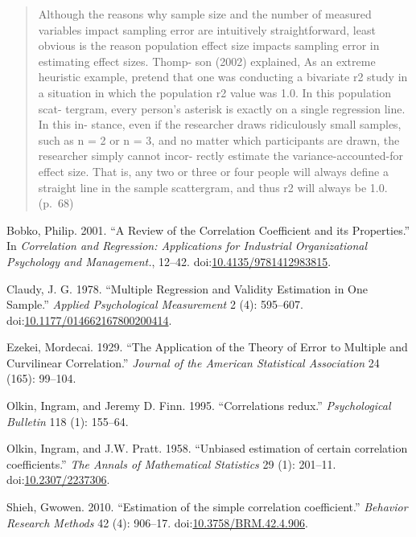\documentclass[]{article}
\begin{document}
\begin{quote}
Although the reasons why sample size and the number of measured
variables impact sampling error are intuitively straightforward, least
obvious is the reason population effect size impacts sampling error in
estimating effect sizes. Thomp- son (2002) explained, As an extreme
heuristic example, pretend that one was conducting a bivariate r2 study
in a situation in which the population r2 value was 1.0. In this
population scat- tergram, every person's asterisk is exactly on a single
regression line. In this in- stance, even if the researcher draws
ridiculously small samples, such as n = 2 or n = 3, and no matter which
participants are drawn, the researcher simply cannot incor- rectly
estimate the variance-accounted-for effect size. That is, any two or
three or four people will always define a straight line in the sample
scattergram, and thus r2 will always be 1.0. (p.~68)
\end{quote}

\hypertarget{refs}{}
\hypertarget{ref-Bobko2001}{}
Bobko, Philip. 2001. ``A Review of the Correlation Coefficient and its
Properties.'' In \emph{Correlation and Regression: Applications for
Industrial Organizational Psychology and Management.}, 12--42.
doi:\href{https://doi.org/10.4135/9781412983815}{10.4135/9781412983815}.

\hypertarget{ref-Claudy1978}{}
Claudy, J. G. 1978. ``Multiple Regression and Validity Estimation in One
Sample.'' \emph{Applied Psychological Measurement} 2 (4): 595--607.
doi:\href{https://doi.org/10.1177/014662167800200414}{10.1177/014662167800200414}.

\hypertarget{ref-Ezekei1929}{}
Ezekei, Mordecai. 1929. ``The Application of the Theory of Error to
Multiple and Curvilinear Correlation.'' \emph{Journal of the American
Statistical Association} 24 (165): 99--104.

\hypertarget{ref-Olkin1995}{}
Olkin, Ingram, and Jeremy D. Finn. 1995. ``Correlations redux.''
\emph{Psychological Bulletin} 118 (1): 155--64.

\hypertarget{ref-Olkin1958}{}
Olkin, Ingram, and J.W. Pratt. 1958. ``Unbiased estimation of certain
correlation coefficients.'' \emph{The Annals of Mathematical Statistics}
29 (1): 201--11.
doi:\href{https://doi.org/10.2307/2237306}{10.2307/2237306}.

\hypertarget{ref-Shieh2010}{}
Shieh, Gwowen. 2010. ``Estimation of the simple correlation
coefficient.'' \emph{Behavior Research Methods} 42 (4): 906--17.
doi:\href{https://doi.org/10.3758/BRM.42.4.906}{10.3758/BRM.42.4.906}.
\end{document}
